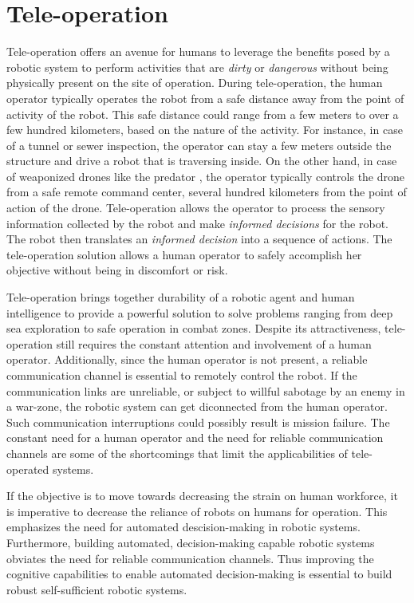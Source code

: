 \section{Tele-operation}

Tele-operation offers an avenue for humans to leverage the benefits posed by a robotic system to perform activities 
that are \emph{dirty} or \emph{dangerous} without being physically present on the site of operation. During tele-operation, the human operator 
typically operates the robot from a safe distance away from the point of activity of the robot. This safe distance could range from a few meters to over a few hundred kilometers, based on the nature of the activity. For instance, in case of a tunnel or sewer inspection, the operator can stay a few meters outside the structure and drive a robot that is traversing inside. On the other hand, in case of weaponized drones like the predator \cite{predator}, the operator typically controls the drone from a safe remote command center, several hundred kilometers from the point of action of the drone. Tele-operation allows the operator to process the sensory information collected by the robot and make \emph{informed decisions} for the robot. The robot then translates an \emph{informed decision} into a sequence of actions. The tele-operation solution allows a human operator to safely accomplish her objective 
without being in discomfort or risk. 

Tele-operation brings together durability of a robotic agent and human intelligence to provide a powerful solution to solve problems ranging from deep sea exploration to safe operation in combat zones. Despite its attractiveness, tele-operation still requires the constant attention and involvement of a human operator. Additionally, since the human operator is not present, a reliable communication channel is essential to remotely control the robot. If the communication links are unreliable, or subject to willful sabotage by an enemy in a war-zone, the robotic system can get diconnected from the human operator. Such communication interruptions could possibly result is mission failure. The constant need for a human operator and the need for reliable communication channels are some of the shortcomings that limit the applicabilities of tele-operated systems.

If the objective is to move towards decreasing the strain on human workforce, it is imperative to decrease the reliance of robots on humans for operation. This emphasizes the need for automated descision-making in robotic systems. Furthermore, building automated, decision-making capable robotic systems obviates the need for reliable communication channels. Thus improving the cognitive capabilities to enable automated decision-making is essential to build robust self-sufficient robotic systems.

